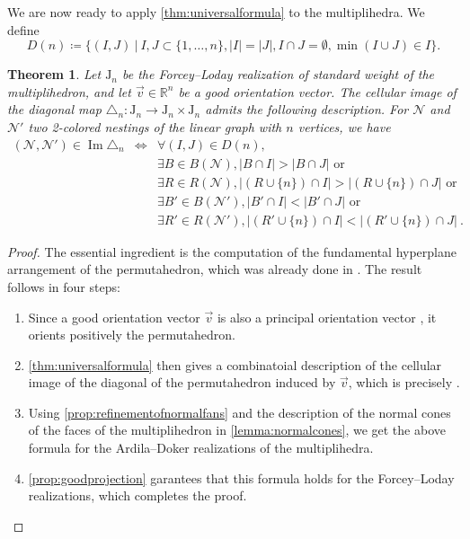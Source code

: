 \documentclass[twoside, 12pt]{amsart}
\newtheorem{theorem}{Theorem}
\theoremstyle{remark}
\newcommand{\RR}{\mathbb{R}}
\newcommand{\J}{\mathrm{J}}
\DeclareMathOperator{\Ima}{Im} %
\begin{document}
We are now ready to apply \cref{thm:universalformula} to the multiplihedra. We define \[ D(n)\coloneqq \{(I,J) \ | \ I,J\subset\{1,\ldots,n\}, |I|=|J|, I\cap J=\emptyset, \min(I\cup J)\in I \}. \]

\begin{theorem}
\label{thm:formuladiagonal}
Let $\J_n$ be the Forcey--Loday realization of standard weight of the multiplihedron, and let $\vec v \in \RR^n$ be a good orientation vector. 
The cellular image of the diagonal map $\triangle_n : \J_n \to \J_n \times \J_n$ admits the following description.
For $\mathcal{N}$ and $\mathcal{N}'$ two 2-colored nestings of the linear graph with $n$ vertices, we have
\begin{eqnarray*}
  (\mathcal{N},\mathcal{N}') \in \Ima\triangle_n 
  & \iff & \forall (I,J) \in D(n), \\
  && \exists B \in B(\mathcal{N}), |B\cap I|>|B\cap J| \text{ or }  \\
  && \exists R \in R(\mathcal{N}), |(R\cup \{n\}) \cap I|>| (R\cup \{n\}) \cap J| \text{ or }  \\
  && \exists B' \in B(\mathcal{N}'), |B'\cap I|<|B'\cap J| \text{ or } \nonumber \\
  && \exists R' \in R(\mathcal{N}'), |(R'\cup \{n\}) \cap I|<| (R'\cup \{n\}) \cap J| \ .
\end{eqnarray*}
\end{theorem}

\begin{proof} 
The essential ingredient is the computation of the fundamental hyperplane arrangement of the permutahedron, which was already done in \cite[Section 3.1]{LA21}. The result follows in four steps:
\begin{enumerate}
\item Since a good orientation vector $\vec v$ is also a principal orientation vector \cite[Definition 3.15]{LA21}, it orients positively the permutahedron. 
\item \cref{thm:universalformula} then gives a combinatoial description of the cellular image of the diagonal of the permutahedron induced by $\vec v$, which is precisely \cite[Theorem 3.16]{LA21}. 
\item Using \cref{prop:refinementofnormalfans} and the description of the normal cones of the faces of the multiplihedron in \cref{lemma:normalcones}, we get the above formula for the Ardila--Doker realizations of the multiplihedra. 
\item \cref{prop:goodprojection} garantees that this formula holds for the Forcey--Loday realizations, which completes the proof.
\end{enumerate}
\end{proof}
\end{document}

